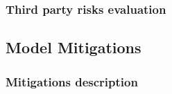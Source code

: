 \documentclass{article}
\begin{document}

\subsubsection{Third party risks evaluation}


\subsection{Model Mitigations}
\subsubsection{Mitigations description}
\end{document}
